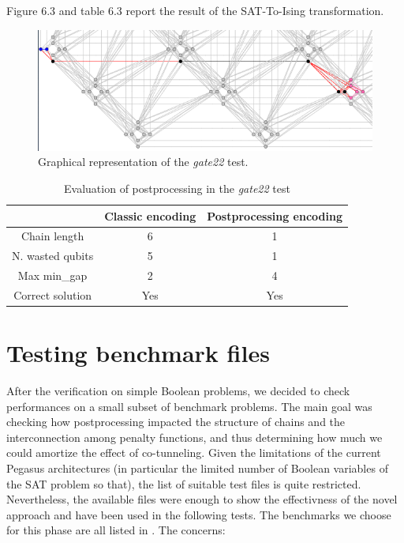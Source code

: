 Figure 6.3 and table 6.3 report the result of the SAT-To-Ising transformation.

\begin{figure}[hbt!]
    \centering
    \includegraphics[width=1.0\textwidth]{images/gate20.PNG}
    \caption{Graphical representation of the \textit{gate22} test.}
    \label{fig:my_label}
\end{figure}

\begin{table}[!hbt]
\centering
\begin{tabular}{|c|c|c|}
\hline
 & \cellcolor[HTML]{FFFE65}Classic encoding & \cellcolor[HTML]{FFFE65}Postprocessing encoding \\ \hline
\cellcolor[HTML]{00D2CB}Chain length & 6 & 1 \\ \hline
\cellcolor[HTML]{00D2CB}N. wasted qubits & 5 & 1 \\ \hline
\cellcolor[HTML]{00D2CB}Max min\_gap & 2 & 4 \\ \hline
\rowcolor[HTML]{67FD9A} 
\cellcolor[HTML]{00D2CB}Correct solution     & Yes                                      & Yes                                             \\ \hline
\end{tabular}
\caption{Evaluation of postprocessing in the \textit{gate22} test}
\end{table}

\newpage

\section{Testing benchmark files}

After the verification on simple Boolean problems, we decided to check performances on a small subset of benchmark problems. The main goal was checking how postprocessing impacted the structure of chains and the interconnection among penalty functions, and thus determining how much we could amortize the effect of co-tunneling. Given the limitations of the current Pegasus architectures (in particular the limited number of Boolean variables of the SAT problem so that), the list of suitable test files is quite restricted. Nevertheless, the available files were enough to show the effectivness of the novel approach and have been used in the following tests. The benchmarks we choose for this phase are all listed in \cite{aiger}. The concerns:

